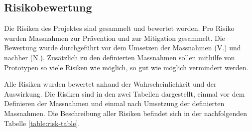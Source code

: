 \subsection{Risikobewertung}\label{risk}

Die Risiken des Projektes sind gesammelt und bewertet worden. Pro Risiko wurden Massnahmen zur Prävention und zur Mitigation gesammelt. Die Bewertung wurde durchgeführt vor dem Umsetzen der Massnahmen (V.) und nachher (N.).
Zusätzlich zu den definierten Massnahmen sollen mithilfe von Prototypen so viele Risiken wie möglich, so gut wie möglich vermindert werden. 

Alle Risiken wurden bewertet anhand der Wahrscheinlichkeit und der Auswirkung. 
Die Risiken sind in den zwei Tabellen dargestellt, einmal vor dem Definieren der Massnahmen und einmal nach Umsetzung der definierten Massnahmen. Die Beschreibung aller Risiken befindet sich in der nachfolgenden Tabelle \ref{table:risk-table}.


